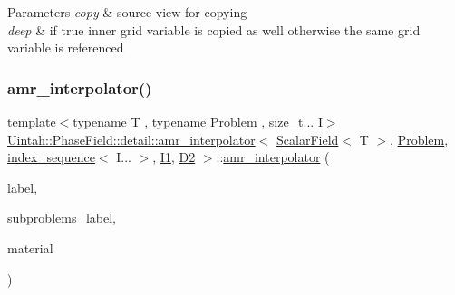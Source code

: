 \begin{DoxyParams}{Parameters}
{\em copy} & source view for copying \\
\hline
{\em deep} & if true inner grid variable is copied as well otherwise the same grid variable is referenced \\
\hline
\end{DoxyParams}
\mbox{\label{classUintah_1_1PhaseField_1_1detail_1_1amr__interpolator_3_01ScalarField_3_01T_01_4_00_01Problemd2db9de1754b5450c93c191a9275f5ed_ad916da29eec73351ea6fb0fd54d24a86}} 
\subsubsection{\texorpdfstring{amr\+\_\+interpolator()}{amr\_interpolator()}\hspace{0.1cm}{\footnotesize\ttfamily [2/4]}}
{\footnotesize\ttfamily template$<$typename T , typename Problem , size\+\_\+t... I$>$ \\
\hyperlink{classUintah_1_1PhaseField_1_1detail_1_1amr__interpolator}{Uintah\+::\+Phase\+Field\+::detail\+::amr\+\_\+interpolator}$<$ \hyperlink{structUintah_1_1PhaseField_1_1ScalarField}{Scalar\+Field}$<$ T $>$, \hyperlink{classUintah_1_1PhaseField_1_1Problem}{Problem}, \hyperlink{namespaceUintah_1_1PhaseField_a237de804d99512e50613aff7c94a9461}{index\+\_\+sequence}$<$ I... $>$, \hyperlink{namespaceUintah_1_1PhaseField_a547ce3002aa97fbd3ef3192a6eec8406a66f19efe774b0d2b6e5844eb2d83d305}{I1}, \hyperlink{namespaceUintah_1_1PhaseField_a12bfc68444894dffdf0cb8d9cf0cc76aa1a451dae278b0103a94105c8776e9a67}{D2} $>$\+::\hyperlink{classUintah_1_1PhaseField_1_1detail_1_1amr__interpolator}{amr\+\_\+interpolator} (\begin{DoxyParamCaption}\item[{const Var\+Label $\ast$}]{label,  }\item[{const Var\+Label $\ast$}]{subproblems\+\_\+label,  }\item[{int}]{material }\end{DoxyParamCaption})\hspace{0.3cm}{\ttfamily [inline]}}



